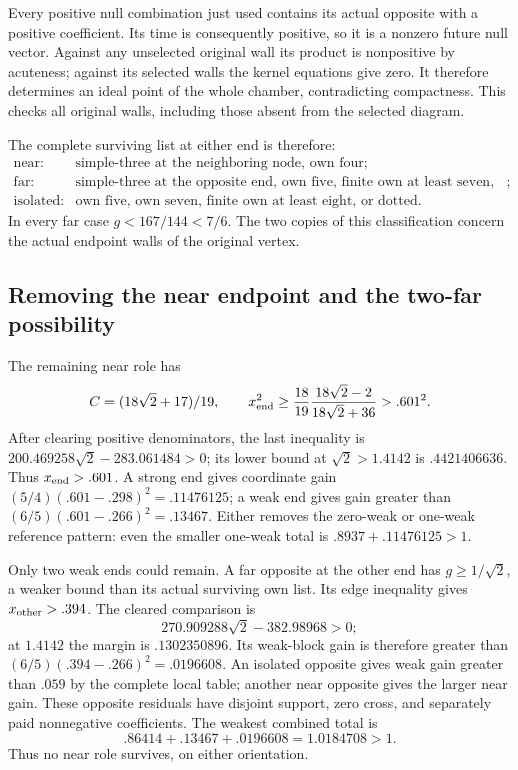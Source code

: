 \documentclass[11pt]{article}
\theoremstyle{definition}
\theoremstyle{remark}
\begin{document}
Every positive null combination just used contains its actual
opposite with a positive coefficient. Its time is consequently
positive, so it is a nonzero future null vector. Against any
unselected original wall its product is nonpositive by acuteness;
against its selected walls the kernel equations give zero.
It therefore determines an ideal point of the whole chamber,
contradicting compactness. This checks all original walls,
including those absent from the selected diagram.

The complete surviving list at either end is therefore:
\[
 \begin{array}{ll}
 \text{near:}&\text{simple-three at the neighboring node, own four};\\
 \text{far:}&\text{simple-three at the opposite end, own five,
                finite own at least seven, or dotted};\\
 \text{isolated:}&\text{own five, own seven,
                finite own at least eight, or dotted}.
 \end{array}
\]
In every far case \(g<167/144<7/6\).
The two copies of this classification concern the actual endpoint
walls of the original vertex.

\subsection{Removing the near endpoint and the two-far possibility}
\label{app:A18nearfar}
The remaining near role has
\[
 C=(18\sqrt2+17)/19,\qquad
 x_{\rm end}^2\geq
 \frac{18}{19}\frac{18\sqrt2-2}{18\sqrt2+36}>.601^2.
\]
After clearing positive denominators, the last inequality is
\(200.469258\sqrt2-283.061484>0\); its lower bound at
\(\sqrt2>1.4142\) is \(.4421406636\).
Thus \(x_{\rm end}>.601\).
A strong end gives coordinate gain
\((5/4)(.601-.298)^2=.11476125\);
a weak end gives gain greater than
\((6/5)(.601-.266)^2=.13467\).
Either removes the zero-weak or one-weak reference pattern:
even the smaller one-weak total is
\(.8937+.11476125>1\).

Only two weak ends could remain. A far opposite at the other end
has \(g\geq1/\sqrt2\), a weaker bound than its actual surviving
own list. Its edge inequality gives \(x_{\rm other}>.394\).
The cleared comparison is
\[
 270.909288\sqrt2-382.98968>0;
\]
at \(1.4142\) the margin is \(.1302350896\).
Its weak-block gain is therefore greater than
\((6/5)(.394-.266)^2=.0196608\).
An isolated opposite gives weak gain greater than \(.059\)
by the complete local table; another near opposite gives the
larger near gain. These opposite residuals have disjoint support,
zero cross, and separately paid nonnegative coefficients.
The weakest combined total is
\[
 .86414+.13467+.0196608=1.0184708>1.
\]
Thus no near role survives, on either orientation.
\end{document}
